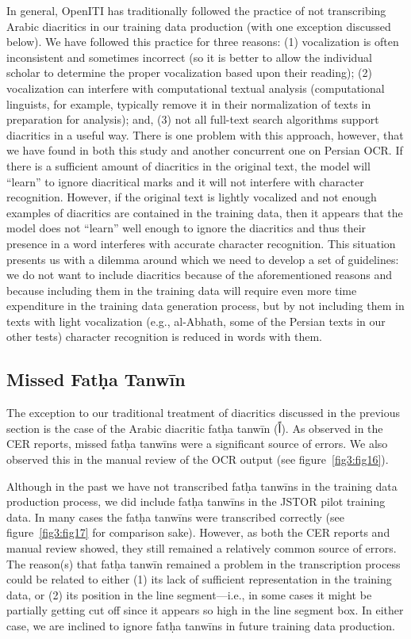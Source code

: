 In general, OpenITI has traditionally followed the practice of not transcribing
Arabic diacritics in our training data production (with one exception discussed
below). We have followed this practice for three reasons: (1) vocalization is
often inconsistent and sometimes incorrect (so it is better to allow the
individual scholar to determine the proper vocalization based upon their
reading); (2) vocalization can interfere with computational textual analysis
(computational linguists, for example, typically remove it in their
normalization of texts in preparation for analysis); and, (3) not all full-text
search algorithms support diacritics in a useful way. There is one problem with
this approach, however, that we have found in both this study and another
concurrent one on Persian OCR. If there is a sufficient amount of diacritics in
the original text, the model will “learn” to ignore diacritical marks and it
will not interfere with character recognition. However, if the original text is
lightly vocalized and not enough examples of diacritics are contained in the
training data, then it appears that the model does not “learn” well enough to
ignore the diacritics and thus their presence in a word interferes with
accurate character recognition. This situation presents us with a dilemma
around which we need to develop a set of guidelines: we do not want to include
diacritics because of the aforementioned reasons and because including them in
the training data will require even more time expenditure in the training data
generation process, but by not including them in texts with light vocalization
(e.g., al-Abhath, some of the Persian texts in our other tests) character
recognition is reduced in words with them. 

\subsection{Missed Fatḥa Tanwīn}

The exception to our traditional treatment of diacritics discussed in the
previous section is the case of the Arabic diacritic fatḥa tanwīn (\textarabic{اً}). As
observed in the CER reports, missed fatḥa tanwīns were a significant source of
errors. We also observed this in the manual review of the OCR output (see
figure~\ref{fig3:fig16}).

Although in the past we have not transcribed fatḥa tanwīns in the training data
production process, we did include fatḥa tanwīns in the JSTOR pilot training
data. In many cases the fatḥa tanwīns were transcribed correctly (see
figure~\ref{fig3:fig17} for comparison sake). However, as both the CER reports
and manual review showed, they still remained a relatively common source of
errors.  The reason(s) that fatḥa tanwīn remained a problem in the
transcription process could be related to either (1) its lack of sufficient
representation in the training data, or (2) its position in the line
segment—i.e., in some cases it might be partially getting cut off since it
appears so high in the line segment box. In either case, we are inclined to
ignore fatḥa tanwīns in future training data production. 

